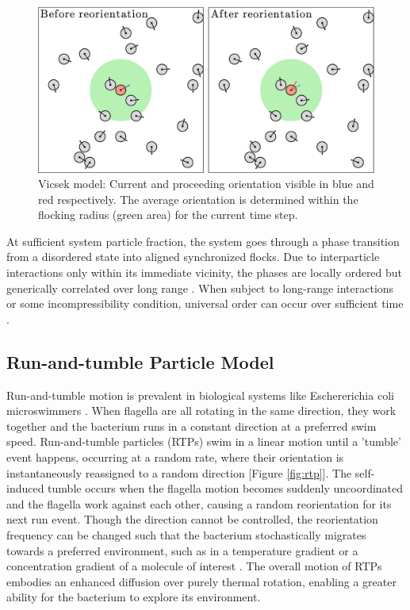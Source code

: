 \documentclass[11pt]{article}
\begin{document}
\begin{figure}[ht]
\centering\includegraphics[width=0.8\linewidth]{462743_1_En_7_Fig6_HTML.png}
\caption{Vicsek model: Current and proceeding orientation visible in blue and red respectively.  The average orientation is determined within the flocking radius (green area) for the current time step.  \cite{Toschi}}
\label{fig:Vicsek}
\end{figure}

At sufficient system particle fraction, the system goes through a phase transition from a  disordered state into aligned synchronized flocks. Due to interparticle interactions only within its immediate vicinity, the phases are locally ordered but generically correlated over long range \cite{Mahault}.  When subject to long-range interactions or some incompressibility condition, universal order can occur over sufficient time \cite{Kayal}.  

\subsection{Run-and-tumble Particle Model}\label{RTPmodel}

Run-and-tumble motion is prevalent in biological systems like Eschererichia coli microswimmers \cite{Sidortsov, Watari}.  When flagella are all rotating in the same direction, they work together and the bacterium runs in a constant direction at a preferred swim speed. Run-and-tumble particles (RTPs) swim in a linear motion until a 'tumble' event happens, occurring at a random rate, where their orientation is instantaneously reassigned to a random direction [Figure \ref{fig:rtp}].  The self-induced tumble occurs when the flagella motion becomes suddenly uncoordinated and the flagella work against each other, causing a random reorientation for its next run event. Though the direction cannot be controlled, the reorientation frequency can be changed such that the bacterium stochastically migrates towards a preferred environment, such as in a temperature gradient or a concentration gradient of a molecule of interest \cite{Berg, Berg2}.  The overall motion of RTPs embodies an enhanced diffusion over purely thermal rotation, enabling a greater ability for the bacterium to explore its environment.
\end{document}
